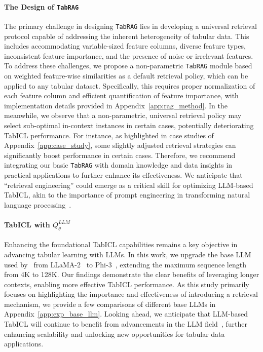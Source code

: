 \paragraph{The Design of \texttt{TabRAG}}
The primary challenge in designing \texttt{TabRAG} lies in developing a universal retrieval protocol capable of addressing the inherent heterogeneity of tabular data. This includes accommodating variable-sized feature columns, diverse feature types, inconsistent feature importance, and the presence of noise or irrelevant features.
To address these challenges, we propose a non-parametric \texttt{TabRAG} module based on weighted feature-wise similarities as a default retrieval policy, which can be applied to any tabular dataset. Specifically, this requires proper normalization of each feature column and efficient quantification of feature importance, with implementation details provided in Appendix~\ref{app:rag_method}.
In the meanwhile, we observe that a non-parametric, universal retrieval policy may select sub-optimal in-context instances in certain cases, potentially deteriorating TabICL performance.
For instance, as highlighted in case studies of Appendix~\ref{app:case_study}, some slightly adjusted retrieval strategies can significantly boost performance in certain cases.
Therefore, we recommend integrating our basic \texttt{TabRAG} with domain knowledge and data insights in practical applications to further enhance its effectiveness.
We anticipate that ``retrieval engineering'' could emerge as a critical skill for optimizing LLM-based TabICL, akin to the importance of prompt engineering in transforming natural language processing~\citep{liu2023prompt_survey}.

\paragraph{TabICL with $Q^{LLM}_\theta$}
Enhancing the foundational TabICL capabilities remains a key objective in advancing tabular learning with LLMs.
In this work, we upgrade the base LLM used by~\citeauthor{wen2024GTL} from LLaMA-2~\citep{touvron2023llama2} to Phi-3~\citep{abdin2024phi3}, extending the maximum sequence length from 4K to 128K.
Our findings demonstrate the clear benefits of leveraging longer contexts, enabling more effective TabICL performance.
As this study primarily focuses on highlighting the importance and effectiveness of introducing a retrieval mechanism, we provide a few comparisons of different base LLMs in Appendix~\ref{app:exp_base_llm}.
Looking ahead, we anticipate that LLM-based TabICL will continue to benefit from advancements in the LLM field~\citep{liu2024deepseekv3}, further enhancing scalability and unlocking new opportunities for tabular data applications.


